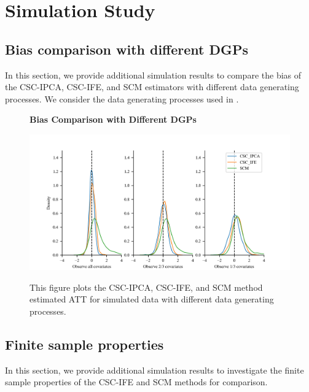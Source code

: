 \documentclass[12pt]{article}
\begin{document}
\section{Simulation Study}
\subsection{Bias comparison with different DGPs}
In this section, we provide additional simulation results to compare the bias of the CSC-IPCA, CSC-IFE, and SCM estimators with different data generating processes. We consider the data generating processes used in \cite{xu2017generalized}.

\begin{figure}[!ht]
    \centering
    \caption{\textbf{Bias Comparison with Different DGPs}}
    \includegraphics{figs/bias_compar2.png}
    \label{app: bias 2}
    \caption*{\footnotesize{This figure plots the CSC-IPCA, CSC-IFE, and SCM method estimated ATT for simulated data with different data generating processes.}}
    \end{figure}

\subsection{Finite sample properties}
\label{app: finite sample}
In this section, we provide additional simulation results to investigate the finite sample properties of the CSC-IFE and SCM methods for comparison.
\end{document}
